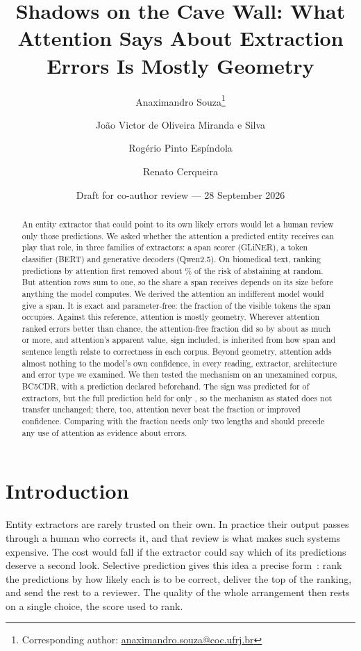\documentclass[11pt,a4paper]{article}
\title{Shadows on the Cave Wall: What Attention Says About Extraction Errors Is Mostly Geometry}
\author[1,2]{Anaximandro Souza\thanks{Corresponding author: \href{mailto:anaximandro.souza@coc.ufrj.br}{anaximandro.souza@coc.ufrj.br}}}
\author[2]{João Victor de Oliveira Miranda e Silva}
\author[1]{Rogério Pinto Espíndola}
\author[2]{Renato Cerqueira}
\affil[1]{PEC/COPPE, Universidade Federal do Rio de Janeiro (UFRJ)}
\affil[2]{PUC-Behring Institute for AI}
\date{Draft for co-author review --- 28 September 2026}
\newcommand{\gliner}{GLiNER}
\begin{document}
\maketitle

\begin{abstract}
An entity extractor that could point to its own likely errors would let a human review only those predictions. We
asked whether the attention a predicted entity receives can play that role, in three families of extractors: a span
scorer (\gliner{}), a token classifier (BERT) and generative decoders (Qwen2.5). On biomedical text, ranking
predictions by attention first removed about \rrGeniaMassBase\% of the risk of abstaining at random. But attention
rows sum to one, so the share a span receives depends on its size before anything the model computes. We derived the
attention an indifferent model would give a span. It is exact and parameter-free: the fraction of the visible tokens
the span occupies. Against this reference, attention is mostly geometry. Wherever attention ranked errors better than
chance, the attention-free fraction did so by about as much or more, and attention's apparent value, sign included, is
inherited from how span and sentence length relate to correctness in each corpus. Beyond geometry, attention adds
almost nothing to the model's own confidence, in every reading, extractor, architecture and error type we examined. We
then tested the mechanism on an unexamined corpus, BC5CDR, with a prediction declared beforehand. The sign was
predicted for \predPoneOk{} of \predN{} extractors, but the full prediction held for only \predConfirmed{}, so the
mechanism as stated does not transfer unchanged; there, too, attention never beat the fraction or improved confidence.
Comparing with the fraction needs only two lengths and should precede any use of attention as evidence about errors.
\end{abstract}

\section{Introduction}
\label{sec:intro}

Entity extractors are rarely trusted on their own. In practice their output passes through a human
who corrects it, and that review is what makes such systems expensive. The cost would fall if the
extractor could say which of its predictions deserve a second look. Selective prediction gives this
idea a precise form~\citep{elyaniv2010foundations,geifman2017selective}: rank the predictions by how
likely each is to be correct, deliver the top of the ranking, and send the rest to a reviewer. The
quality of the whole arrangement then rests on a single choice, the score used to rank.
\end{document}
